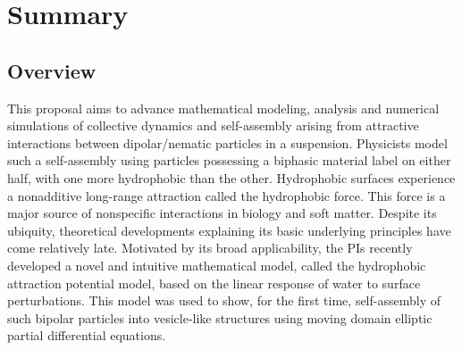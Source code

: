 \documentclass[10pt]{article}
\begin{document}
\section*{Summary}


\subsection*{Overview}
\vspace{-0.1in}
This proposal aims to advance mathematical modeling, analysis and numerical simulations of
collective dynamics and self-assembly arising from attractive
interactions between dipolar/nematic particles in a suspension. 
%
%
Physicists model such a self-assembly
using particles possessing a biphasic material label on either half,
with one more hydrophobic than the other. Hydrophobic surfaces
experience a nonadditive long-range attraction called the hydrophobic
force. This force is a major source of nonspecific interactions in
biology and soft matter. Despite its ubiquity, theoretical developments
explaining its basic underlying principles have come relatively late.
Motivated by its broad applicability, the PIs recently developed a novel
and intuitive mathematical model, called the hydrophobic attraction
potential model, based on the linear response of water to surface
perturbations. This model was used to show, for the first time,
self-assembly of such bipolar particles into vesicle-like structures
using moving domain elliptic partial differential equations.



\end{document}
